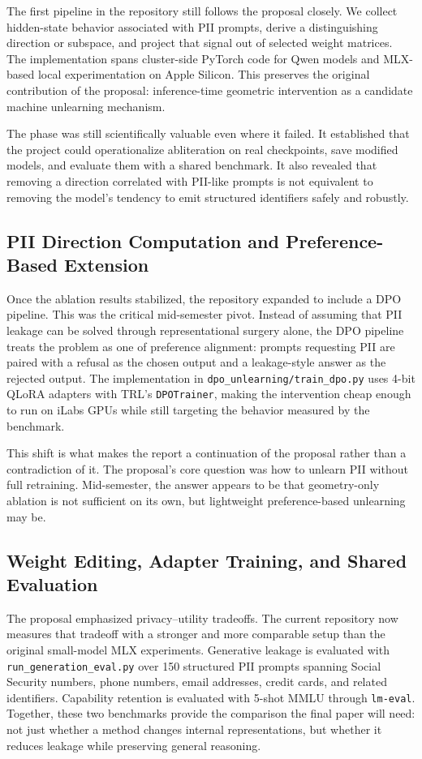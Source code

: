 \documentclass[11pt]{article}
\begin{document}
The first pipeline in the repository still follows the proposal closely. We collect hidden-state behavior associated with PII prompts, derive a distinguishing direction or subspace, and project that signal out of selected weight matrices. The implementation spans cluster-side PyTorch code for Qwen models and MLX-based local experimentation on Apple Silicon. This preserves the original contribution of the proposal: inference-time geometric intervention as a candidate machine unlearning mechanism.

The phase was still scientifically valuable even where it failed. It established that the project could operationalize abliteration on real checkpoints, save modified models, and evaluate them with a shared benchmark. It also revealed that removing a direction correlated with PII-like prompts is not equivalent to removing the model's tendency to emit structured identifiers safely and robustly.

\subsection{PII Direction Computation and Preference-Based Extension}

Once the ablation results stabilized, the repository expanded to include a DPO pipeline. This was the critical mid-semester pivot. Instead of assuming that PII leakage can be solved through representational surgery alone, the DPO pipeline treats the problem as one of preference alignment: prompts requesting PII are paired with a refusal as the chosen output and a leakage-style answer as the rejected output. The implementation in \texttt{dpo\_unlearning/train\_dpo.py} uses 4-bit QLoRA adapters with TRL's \texttt{DPOTrainer}, making the intervention cheap enough to run on iLabs GPUs while still targeting the behavior measured by the benchmark.

This shift is what makes the report a continuation of the proposal rather than a contradiction of it. The proposal's core question was how to unlearn PII without full retraining. Mid-semester, the answer appears to be that geometry-only ablation is not sufficient on its own, but lightweight preference-based unlearning may be.

\subsection{Weight Editing, Adapter Training, and Shared Evaluation}

The proposal emphasized privacy--utility tradeoffs. The current repository now measures that tradeoff with a stronger and more comparable setup than the original small-model MLX experiments. Generative leakage is evaluated with \texttt{run\_generation\_eval.py} over 150 structured PII prompts spanning Social Security numbers, phone numbers, email addresses, credit cards, and related identifiers. Capability retention is evaluated with 5-shot MMLU through \texttt{lm-eval}. Together, these two benchmarks provide the comparison the final paper will need: not just whether a method changes internal representations, but whether it reduces leakage while preserving general reasoning.
\end{document}
